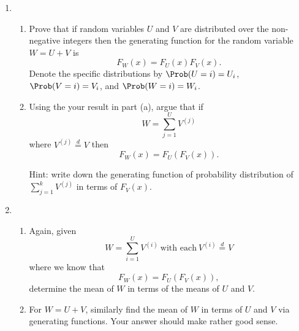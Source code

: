 \begin{enumerate}
\begin{enumerate}

   \solutionend

       \end{enumerate}

     \item

       \begin{enumerate}
       \item 

         Prove that if random variables $U$ and $V$ are distributed
         over the non-negative integers 
         then the generating function for the random variable $W = U + V$ 
         is
         $$
         F_{W}(x) = F_{U}(x) F_{V}(x).
         $$
         Denote the specific distributions by
         $\Prob(U=i) = U_{i}$,
         $\Prob(V=i) = V_{i}$,
         and 
         $\Prob(W=i) = W_{i}$.

         
   \solutionstart


   \solutionend

       \item

         Using the your result in part (a), argue that 
         if 
         $$
         W = \sum_{j=1}^{U} V^{(j)}
         $$
         where $V^{(j)} \stackrel{d}{=} V$
         then 
         $$
         F_{W}(x) = F_{U}(F_{V}(x)).
         $$

         Hint: write down the generating function
         of probability distribution of 
         $\sum_{j=1}^{k} V^{(j)}$ in terms of $F_{V}(x)$.

         
   \solutionstart


   \solutionend
       \end{enumerate}

     \item

       \begin{enumerate}
       \item 
         Again, given 
         $$
         W = \sum_{i=1}^{U} V^{(i)}
         \
         \mbox{with each}
         \
         V^{(i)}
         \stackrel{d}{=}
         V
         $$
         where we know that
         $$
         F_{W}(x) 
         = 
         F_{U} 
         \left(
         F_{V}(x)
         \right),
         $$
         determine the mean of $W$
         in terms of the means of $U$ and $V$.
       \item
         For $W = U + V$, similarly find
         the mean of $W$ in terms of $U$ and $V$ 
         via generating functions.
         Your answer should make rather good sense.
       \end{enumerate}


\end{enumerate}
